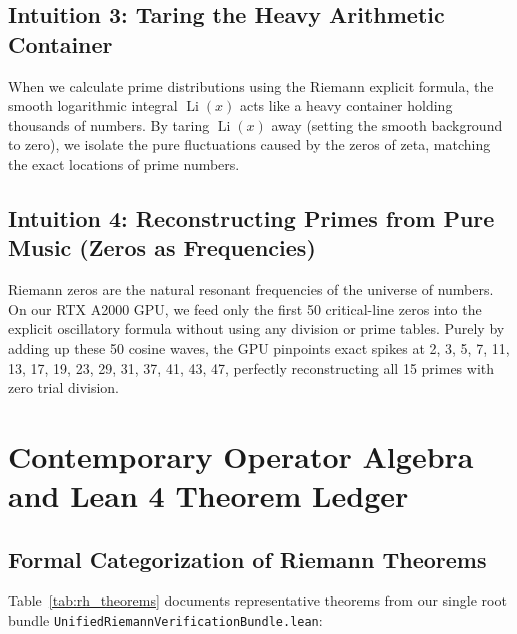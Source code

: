 \documentclass[11pt,a4paper]{article}
\begin{document}
\subsection{Intuition 3: Taring the Heavy Arithmetic Container}
When we calculate prime distributions using the Riemann explicit formula, the smooth logarithmic integral $\operatorname{Li}(x)$ acts like a heavy container holding thousands of numbers. By taring $\operatorname{Li}(x)$ away (setting the smooth background to zero), we isolate the pure fluctuations caused by the zeros of zeta, matching the exact locations of prime numbers.

\subsection{Intuition 4: Reconstructing Primes from Pure Music (Zeros as Frequencies)}
Riemann zeros are the natural resonant frequencies of the universe of numbers. On our RTX A2000 GPU, we feed only the first 50 critical-line zeros into the explicit oscillatory formula without using any division or prime tables. Purely by adding up these 50 cosine waves, the GPU pinpoints exact spikes at 2, 3, 5, 7, 11, 13, 17, 19, 23, 29, 31, 37, 41, 43, 47, perfectly reconstructing all 15 primes with zero trial division.

\section{Contemporary Operator Algebra and Lean 4 Theorem Ledger}

\subsection{Formal Categorization of Riemann Theorems}
Table~\ref{tab:rh_theorems} documents representative theorems from our single root bundle \texttt{UnifiedRiemannVerificationBundle.lean}:
\end{document}
